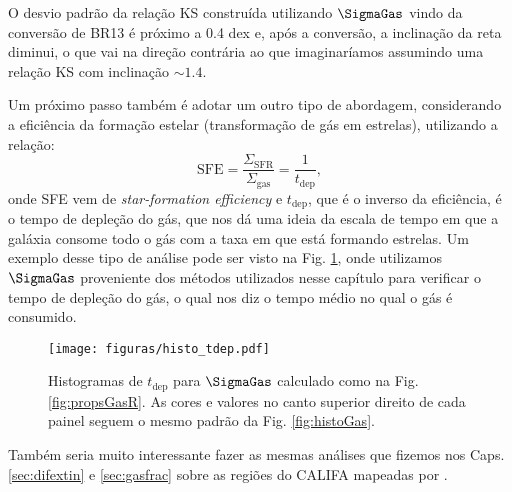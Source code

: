 O desvio padrão da relação KS construída utilizando $\SigmaGas$ vindo da conversão de
BR13 é próximo a 0.4 dex e, após a conversão, a inclinação da reta diminui, o que vai na direção
contrária ao que imaginaríamos assumindo uma relação KS com inclinação $\sim 1.4$. 

Um próximo passo também é adotar um outro tipo de abordagem, considerando a eficiência da
formação estelar (transformação de gás em estrelas), utilizando a relação:
\begin{equation}
	\mathrm{SFE} = \frac{\Sigma_{\mathrm{SFR}}}{\Sigma_{\mathrm{gas}}} = \frac{1}{t_{\mathrm{dep}}},
	\label{eq:SFE}
\end{equation}
\noindent onde SFE vem de {\em star-formation efficiency} e $t_{\mathrm{dep}}$, que é o inverso da
eficiência, é o tempo de depleção do gás, que nos dá uma ideia da escala de tempo em que a galáxia
consome todo o gás com a taxa em que está formando estrelas. Um exemplo desse tipo de análise pode
ser visto na Fig. \ref{fig:tdep}, onde utilizamos $\SigmaGas$ proveniente dos métodos utilizados
nesse capítulo para verificar o tempo de depleção do gás, o qual nos diz o tempo médio no qual o
gás é consumido.

\begin{figure}
	\centering
	\texttt{[image: figuras/histo\_tdep.pdf]}
	\caption[Tempo de depleção do gás]
	{Histogramas de $t_{\mathrm{dep}}$ para $\SigmaGas$ calculado como na Fig. \ref{fig:propsGasR}.
As cores e valores no canto superior direito de cada painel seguem o mesmo padrão da Fig. \ref{fig:histoGas}.}
	\label{fig:tdep}
\end{figure}

Também seria muito interessante fazer as mesmas análises que fizemos nos Caps. \ref{sec:difextin} e
\ref{sec:gasfrac} sobre as regiões \Hii do CALIFA mapeadas por \citet{Sanchez.etal.2012b}.
% 

